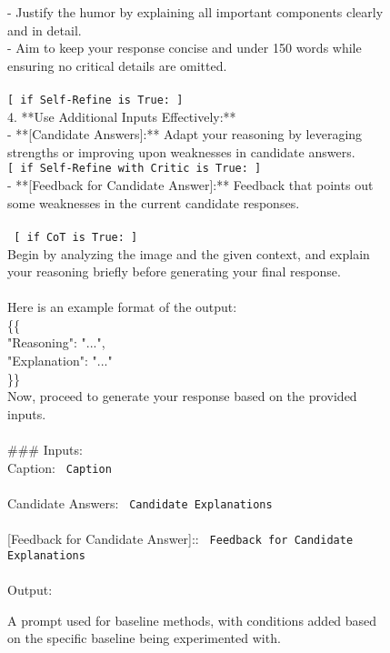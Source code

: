 \begin{figure*}
\begin{tcolorbox}
- Justify the humor by explaining all important components clearly and in detail.  \\
- Aim to keep your response concise and under 150 words while ensuring no critical details are omitted.  \\
\\
\texttt{[ if Self-Refine is True: ]}\\
4. **Use Additional Inputs Effectively:**\\
- **[Candidate Answers]:** Adapt your reasoning by leveraging strengths or improving upon weaknesses in candidate answers. \\
\texttt{[ if Self-Refine with Critic is True: ]}\\
- **[Feedback for Candidate Answer]:** Feedback that points out some weaknesses in the current candidate responses.\\
\\
\texttt{ [ if CoT is True: ]} \\
Begin by analyzing the image and the given context, and explain your reasoning briefly before generating your final response. \\
\\
Here is an example format of the output: \\
\{\{ \\
    "Reasoning": "...", \\
    "Explanation": "..."   \\
\}\} \\

Now, proceed to generate your response based on the provided inputs.\\
\\
\#\#\# Inputs:\\
\text{[}Caption\text{]}: \texttt{\text{[} Caption \text{]}}\\
\\
\text{[}Candidate Answers\text{]}: \texttt{\text{[} Candidate Explanations \text{]}}\\
\\
\text{[}[Feedback for Candidate Answer]:\text{]}: \texttt{\text{[} Feedback for Candidate Explanations \text{]}}\\
\\
\text{[}Output\text{]}:\\

\end{tcolorbox}
\caption{A prompt used for baseline methods, with conditions added based on the specific baseline being experimented with.} %
\label{fig:base-prompt}
\end{figure*}


